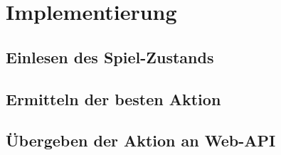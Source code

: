 \chapter{Implementierung}
\label{ch:implementierung}


\section{Einlesen des Spiel-Zustands}
\label{sec:einlesen-spielzustand}

\section{Ermitteln der besten Aktion}
\label{sec:ermitteln-aktion}

\section{Übergeben der Aktion an Web-API}
\label{sec:uebergabe-aktion}